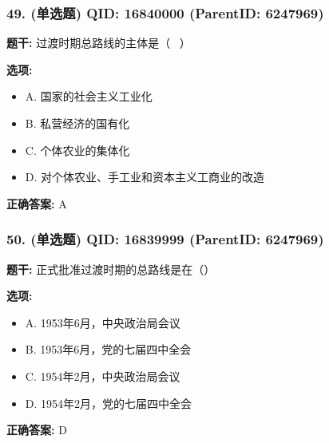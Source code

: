 \documentclass[12pt,UTF8]{ctexart}
\begin{document}
\vspace{0.3em}\hrulefill\vspace{0.7em}

\subsubsection*{49. (单选题) \small QID: 16840000 (ParentID: 6247969)}

\textbf{题干:}
过渡时期总路线的主体是（  ）



\textbf{选项:}
\begin{itemize}[leftmargin=*]

  \item A. 国家的社会主义工业化

  \item B. 私营经济的国有化

  \item C. 个体农业的集体化

  \item D. 对个体农业、手工业和资本主义工商业的改造

\end{itemize}

\textbf{正确答案:}
A

\vspace{0.3em}\hrulefill\vspace{0.7em}

\subsubsection*{50. (单选题) \small QID: 16839999 (ParentID: 6247969)}

\textbf{题干:}
正式批准过渡时期的总路线是在（）



\textbf{选项:}
\begin{itemize}[leftmargin=*]

  \item A. 1953年6月，中央政治局会议

  \item B. 1953年6月，党的七届四中全会

  \item C. 1954年2月，中央政治局会议

  \item D. 1954年2月，党的七届四中全会

\end{itemize}

\textbf{正确答案:}
D
\end{document}

